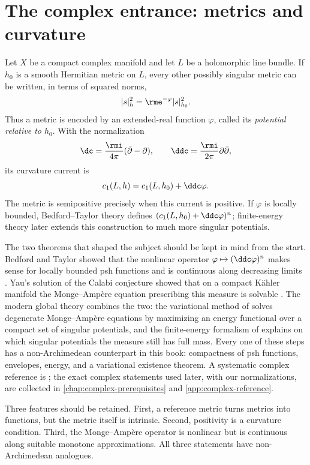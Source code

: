 \section{The complex entrance: metrics and curvature}
\label{sec:ch01-complex-entrance}

Let $X$ be a compact complex manifold and let $L$ be a holomorphic line
bundle.  If $h_0$ is a smooth Hermitian metric on $L$, every other possibly
singular metric can be written, in terms of squared norms,
\[
             |s|_h^2=\rme^{-\varphi}|s|_{h_0}^2.
\]
Thus a metric is encoded by an extended-real function $\varphi$, called its
\emph{potential relative to $h_0$}.  With the normalization
\[
             \dc=\frac{\rmi}{4\pi}(\bar\partial-\partial),
             \qquad \ddc=\frac{\rmi}{2\pi}\partial\bar\partial,
\]
its curvature current is
\[
             c_1(L,h)=c_1(L,h_0)+\ddc\varphi.
\]
The metric is semipositive precisely when this current is positive.  If
$\varphi$ is locally bounded, Bedford--Taylor theory defines
$(c_1(L,h_0)+\ddc\varphi)^n$; finite-energy theory later extends this
construction to much more singular potentials.

The two theorems that shaped the subject should be kept in mind from the
start.  Bedford and Taylor showed that the nonlinear operator
$\varphi\mapsto(\ddc\varphi)^n$ makes sense for locally bounded psh functions
and is continuous along decreasing limits \cite{BT76,BT82}.  Yau's solution
of the Calabi conjecture showed that on a compact K\"ahler manifold the
Monge--Amp\`ere equation prescribing this measure is solvable \cite{Y78}.
The modern global theory combines the two: the variational method of
\cite{BBGZ13} solves degenerate Monge--Amp\`ere equations by maximizing an
energy functional over a compact set of singular potentials, and the
finite-energy formalism of \cite{BEGZ10} explains on which singular
potentials the measure still has full mass.  Every one of these steps has a
non-Archimedean counterpart in this book: compactness of psh functions,
envelopes, energy, and a variational existence theorem.  A systematic
complex reference is \cite{GZ17}; the exact complex statements used later,
with our normalizations, are collected in \cref{chap:complex-prerequisites}
and \cref{app:complex-reference}.

Three features should be retained.  First, a reference metric turns metrics
into functions, but the metric itself is intrinsic.  Second, positivity is a
curvature condition.  Third, the Monge--Amp\`ere operator is nonlinear but is
continuous along suitable monotone approximations.  All three statements
have non-Archimedean analogues.

